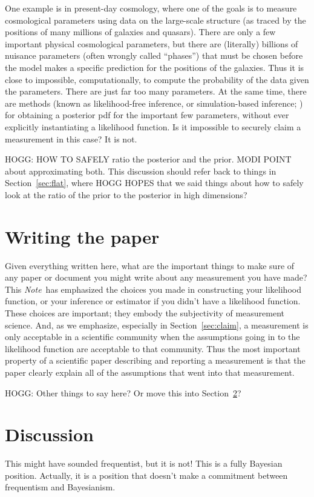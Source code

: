 \documentclass{article}
\newcommand{\documentname}{\textsl{Note}}
\newcommand{\sectionname}{Section}
\newcommand{\secref}[1]{\sectionname~\ref{#1}}
\begin{document}
One example is in present-day cosmology, where one of the goals is to measure cosmological parameters using data on the large-scale structure (as traced by the positions of many millions of galaxies and quasars).
There are only a few important physical cosmological parameters, but there are (literally) billions of nuisance parameters (often wrongly called ``phases'') that must be chosen before the model makes a specific prediction for the positions of the galaxies.
Thus it is close to impossible, computationally, to compute the probability of the data given the parameters.
There are just far too many parameters.
At the same time, there are methods (known as likelihood-free inference, or simulation-based inference; \cite{abc, sbi}) for obtaining a posterior pdf for the important few parameters, without ever explicitly instantiating a likelihood function.
Is it impossible to securely claim a measurement in this case?
It is not.

HOGG: HOW TO SAFELY ratio the posterior and the prior. MODI POINT about approximating both.
This discussion should refer back to things in \secref{sec:flat}, where HOGG HOPES that we said things about how to safely look at the ratio of the prior to the posterior in high dimensions?

\section{Writing the paper}\label{sec:writing}
Given everything written here, what are the important things to make sure of any paper or document you might write about any measurement you have made?
This \documentname\ has emphasized the choices you made in constructing your likelihood function, or your inference or estimator if you didn't have a likelihood function.
These choices are important; they embody the subjectivity of measurement science.
And, as we emphasize, especially in \secref{sec:claim}, a measurement is only acceptable in a scientific community when the assumptions going in to the likelihood function are acceptable to that community.
Thus the most important property of a scientific paper describing and reporting a measurement is that the paper clearly explain all of the assumptions that went into that measurement.

HOGG: Other things to say here? Or move this into \secref{sec:discussion}?

\section{Discussion}\label{sec:discussion}
This might have sounded frequentist, but it is not!
This is a fully Bayesian position.
Actually, it is a position that doesn't make a commitment between frequentism and Bayesianism.
\end{document}
